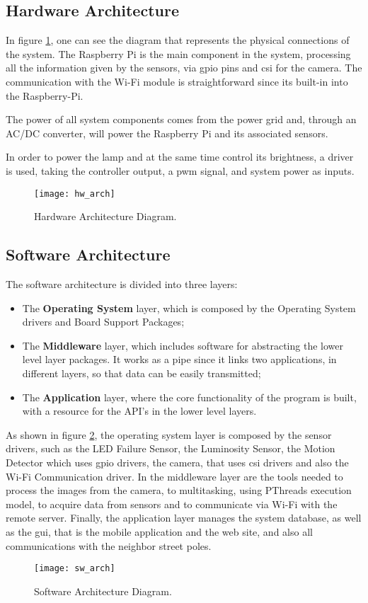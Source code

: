 \clearpage

\subsection{Hardware Architecture}
In figure \ref{fig:hw_arch}, one can see the diagram that represents the physical connections of the system. The Raspberry Pi is the main component in the system, processing all the information given by the sensors, via \ac{gpio} pins and \ac{csi} for the camera. The communication with the Wi-Fi module is straightforward since its built-in into the Raspberry-Pi.

The power of all system components comes from the power grid and, through an AC/DC converter, will power the Raspberry Pi and its associated sensors.

In order to power the lamp and at the same time control its brightness, a driver is used, taking the controller output, a \ac{pwm} signal, and system power as inputs. 

\begin{figure}[ht]
	\centering
	\texttt{[image: hw\_arch]}
	\caption{Hardware Architecture Diagram.}
	\label{fig:hw_arch}
\end{figure}

\subsection{Software Architecture}
The software architecture is divided into three layers:

\begin{itemize}
	\item The \textbf{Operating System} layer, which is composed by the Operating System drivers and Board Support Packages;
	\item The \textbf{Middleware} layer, which includes software for abstracting the lower level layer packages. It works as a pipe since it links two applications, in different layers, so that data can be easily transmitted;
	\item The \textbf{Application} layer, where the core functionality of the program is built, with a resource for the API's in the lower level layers.
\end{itemize}

As shown in figure \ref{fig:sw_arch}, the operating system layer is composed by the sensor drivers, such as the LED Failure Sensor, the Luminosity Sensor, the Motion Detector which uses \ac{gpio} drivers, the camera, that uses \ac{csi} drivers and also the Wi-Fi Communication driver. In the middleware layer are the tools needed to process the images from the camera, to multitasking, using PThreads execution model, to acquire data from sensors and to communicate via Wi-Fi with the remote server. Finally, the application layer manages the system database, as well as the \ac{gui}, that is the mobile application and the web site, and also all communications with the neighbor street poles.

\begin{figure}[ht]
	\centering
	\texttt{[image: sw\_arch]}
	\caption{Software Architecture Diagram.}
	\label{fig:sw_arch}
\end{figure}